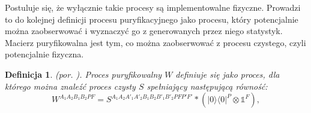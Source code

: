 \documentclass[10pt]{article} %
\newtheorem{definicja}{Definicja}
\DeclareMathOperator{\Trs}{Tr}
\newcommand{\Ket}[1]{|#1\rangle}
\newcommand{\Bra}[1]{\langle#1|}
\newcommand{\BBra}[1]{\langle\langle#1|}
\newcommand{\KKet}[1]{|#1\rangle\rangle}
\newcommand{\I}{\mathbb{1}}
\begin{document}
Postuluje się, że wyłącznie takie procesy są implementowalne fizyczne. Prowadzi to do kolejnej definicji procesu puryfikacyjnego jako procesu, który potencjalnie można zaobserwować i wyznaczyć go z generowanych przez niego statystyk. Macierz puryfikowalna jest tym, co można zaobserwować z procesu czystego, czyli potencjalnie fizyczna.
\begin{definicja}
(por. \cite{purification}). Proces puryfikowalny $W$ definiuje się jako proces, dla którego można znaleźć proces czysty $S$ spełniający następującą równość:
\begin{equation}
\label{eq:purif}
W^{A_1A_2B_1B_2PF} = S^{A_1A_2A'_1A'_2B_1B_2B'_1B'_2PFP'F'} * \left( \Ket{0}\Bra{0}^P \otimes \I^F \right),
\end{equation}
\end{definicja}
\end{document}
